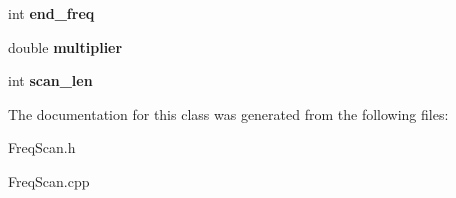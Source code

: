 \begin{DoxyCompactItemize}
\item 
\hypertarget{class_c_freq_scan_a61fe65ad1c950d45c05b20bd762efd11}{int {\bfseries end\-\_\-freq}}\label{class_c_freq_scan_a61fe65ad1c950d45c05b20bd762efd11}

\item 
\hypertarget{class_c_freq_scan_a2cd0d46596033f2989642969f77201bb}{double {\bfseries multiplier}}\label{class_c_freq_scan_a2cd0d46596033f2989642969f77201bb}

\item 
\hypertarget{class_c_freq_scan_a0d9a58acb413498d31d208d8713ad917}{int {\bfseries scan\-\_\-len}}\label{class_c_freq_scan_a0d9a58acb413498d31d208d8713ad917}

\end{DoxyCompactItemize}


The documentation for this class was generated from the following files\-:\begin{DoxyCompactItemize}
\item 
Freq\-Scan.\-h\item 
Freq\-Scan.\-cpp\end{DoxyCompactItemize}
